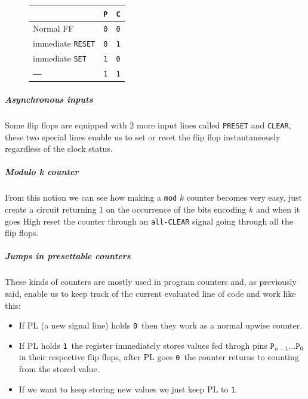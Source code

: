 \documentclass{scrartcl}
\newcommand{\zero}{\texttt{0}}
\newcommand{\one}{\texttt{1}}
\begin{document}
    \begin{figure}
        \centering
        \begin{tabular}{| l | c | c |}
            \hline
            & \texttt{P} & \texttt{C} \\\hline
            Normal FF & \zero & \zero\\
            immediate \texttt{RESET} & \zero & \one\\
            immediate \texttt{SET} & \one & \zero\\
            \texttt{-----} & \one & \one\\\hline
        \end{tabular}
    \end{figure}
    \vspace{-1cm}
    \subparagraph{Asynchronous inputs} Some flip flops are equipped with 2 more input lines called \texttt{PRESET} and \texttt{CLEAR}, these two special lines enable us to set or reset the flip flop instantaneously regardless of the clock status.
    \subparagraph{Modulo k counter} From this notion we can see how making a \texttt{mod} $k$ counter becomes very easy, just create a circuit returning 1 on the occurrence of the bits encoding $k$ and when it goes High reset the counter through an \texttt{all-CLEAR} signal going through all the flip flops.
    \subparagraph{Jumps in presettable counters} These kinds of counters are mostly used in program counters and, as previously said, enable us to keep track of the current evaluated line of code and work like this:
    \begin{itemize}
        \item If PL (a new signal line) holds \zero\ then they work as a normal upwise counter.
        \item If PL holds \one\ the register immediately stores values fed throgh pins $\texttt{P}_{n-1}\dots\texttt{P}_0$ in their respective flip flops, after PL goes \zero\ the counter returns to counting from the stored value.
        \item If we want to keep storing new values we just keep PL to \one.
    \end{itemize}
\end{document}
